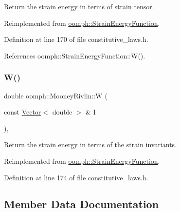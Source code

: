 Return the strain energy in terms of strain tensor. 



Reimplemented from \hyperlink{classoomph_1_1StrainEnergyFunction_a76cadaefaa89b93793c893f1302bd68a}{oomph\+::\+Strain\+Energy\+Function}.



Definition at line 170 of file constitutive\+\_\+laws.\+h.



References oomph\+::\+Strain\+Energy\+Function\+::\+W().

\mbox{\label{classoomph_1_1MooneyRivlin_aa610beb4e7b06dc3aa57bbc552ca0b80}} 
\subsubsection{\texorpdfstring{W()}{W()}\hspace{0.1cm}{\footnotesize\ttfamily [2/2]}}
{\footnotesize\ttfamily double oomph\+::\+Mooney\+Rivlin\+::W (\begin{DoxyParamCaption}\item[{const \hyperlink{classoomph_1_1Vector}{Vector}$<$ double $>$ \&}]{I }\end{DoxyParamCaption})\hspace{0.3cm}{\ttfamily [inline]}, {\ttfamily [virtual]}}



Return the strain energy in terms of the strain invariants. 



Reimplemented from \hyperlink{classoomph_1_1StrainEnergyFunction_a99df34610d4542568f65c568ae3a908f}{oomph\+::\+Strain\+Energy\+Function}.



Definition at line 174 of file constitutive\+\_\+laws.\+h.



\subsection{Member Data Documentation}
\mbox{\label{classoomph_1_1MooneyRivlin_abbaf1eefb4ccf8a51224bd18e903449b}} 
